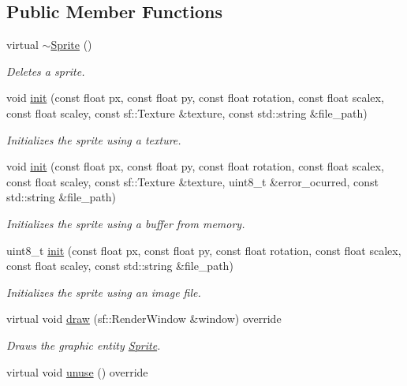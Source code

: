 \subsection*{Public Member Functions}
\begin{DoxyCompactItemize}
\item 
virtual \hyperlink{class_sprite_aff0448963fc0515aad87ac0cce6f8bc2}{$\sim$\+Sprite} ()
\begin{DoxyCompactList}\small\item\em Deletes a sprite. \end{DoxyCompactList}\item 
void \hyperlink{class_sprite_a4b50f5151037d0f43261d368f59102a2}{init} (const float px, const float py, const float rotation, const float scalex, const float scaley, const sf\+::\+Texture \&texture, const std\+::string \&file\+\_\+path)
\begin{DoxyCompactList}\small\item\em Initializes the sprite using a texture. \end{DoxyCompactList}\item 
void \hyperlink{class_sprite_a593a27688564e715f8af570c2a7a8150}{init} (const float px, const float py, const float rotation, const float scalex, const float scaley, const sf\+::\+Texture \&texture, uint8\+\_\+t \&error\+\_\+ocurred, const std\+::string \&file\+\_\+path)
\begin{DoxyCompactList}\small\item\em Initializes the sprite using a buffer from memory. \end{DoxyCompactList}\item 
uint8\+\_\+t \hyperlink{class_sprite_ae60101c72db08a33215ec89faae8a87c}{init} (const float px, const float py, const float rotation, const float scalex, const float scaley, const std\+::string \&file\+\_\+path)
\begin{DoxyCompactList}\small\item\em Initializes the sprite using an image file. \end{DoxyCompactList}\item 
virtual void \hyperlink{class_sprite_a067dfc27f53ce4d983db29407be1c11e}{draw} (sf\+::\+Render\+Window \&window) override
\begin{DoxyCompactList}\small\item\em Draws the graphic entity \hyperlink{class_sprite}{Sprite}. \end{DoxyCompactList}\item 
virtual void \hyperlink{class_sprite_a26066db75daec637f436d4635418059a}{unuse} () override

\end{DoxyCompactItemize}
